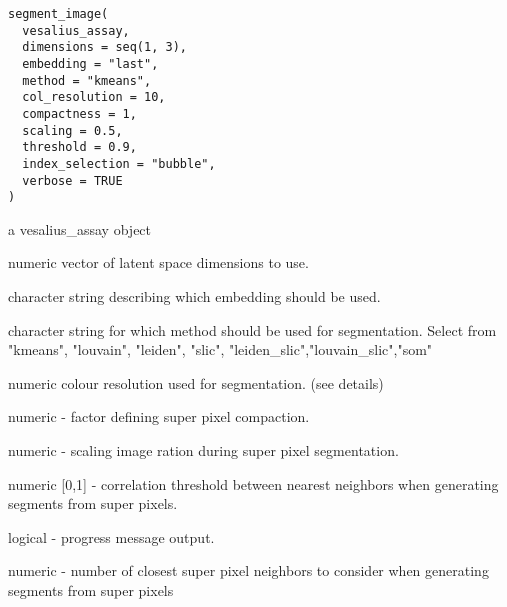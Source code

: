 \documentclass[a4paper]{book}
\begin{document}
%
\begin{Usage}
\begin{verbatim}
segment_image(
  vesalius_assay,
  dimensions = seq(1, 3),
  embedding = "last",
  method = "kmeans",
  col_resolution = 10,
  compactness = 1,
  scaling = 0.5,
  threshold = 0.9,
  index_selection = "bubble",
  verbose = TRUE
)
\end{verbatim}
\end{Usage}
%
\begin{Arguments}
\begin{ldescription}
\item[\code{vesalius\_assay}] a vesalius\_assay object

\item[\code{dimensions}] numeric vector of latent space dimensions to use.

\item[\code{embedding}] character string describing which embedding should
be used.

\item[\code{method}] character string for which method should be used for
segmentation. Select from "kmeans", "louvain", "leiden", "slic", 
"leiden\_slic","louvain\_slic","som"

\item[\code{col\_resolution}] numeric colour resolution used for segmentation. 
(see details)

\item[\code{compactness}] numeric - factor defining super pixel compaction.

\item[\code{scaling}] numeric - scaling image ration during super pixel 
segmentation.

\item[\code{threshold}] numeric [0,1] - correlation threshold between 
nearest neighbors when generating segments from super pixels.

\item[\code{verbose}] logical - progress message output.

\item[\code{k}] numeric - number of closest super pixel neighbors to consider
when generating segments from super pixels
\end{ldescription}
\end{Arguments}
%
\end{document}
